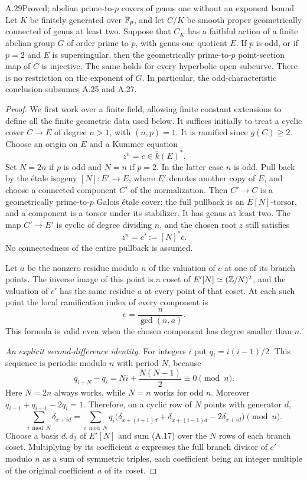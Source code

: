 \begin{claim}{A.29}{Proved; abelian prime-to-$p$ covers of genus one without an exponent bound}
Let $K$ be finitely generated over $\mathbb F_p$, and let $C/K$ be
smooth proper geometrically connected of genus at least two.
Suppose that $C_{\overline K}$ has a faithful action of a finite
abelian group $G$ of order prime to $p$, with genus-one quotient
$E$. If $p$ is odd, or if $p=2$ and $E$ is supersingular, then
the geometrically prime-to-$p$ point-section map of $C$ is
injective. The same holds for every hyperbolic open subcurve.
There is no restriction on the exponent of $G$. In particular,
the odd-characteristic conclusion subsumes A.25 and A.27.
\end{claim}
\begin{proof}
We first work over a finite field, allowing finite constant
extensions to define all the finite geometric data used below.
It suffices initially to treat a cyclic cover $C\to E$ of degree
$n>1$, with $(n,p)=1$. It is ramified since $g(C)\ge2$.
Choose an origin on $E$ and a Kummer equation
\[
 z^n=c\in\overline k(E)^*.
\]
Set $N=2n$ if $p$ is odd and $N=n$ if $p=2$. In the latter
case $n$ is odd. Pull back by the \'etale isogeny
$[N]:E'\to E$, where $E'$ denotes another copy of $E$, and
choose a connected component $C'$ of the normalization. Then
$C'\to C$ is a geometrically prime-to-$p$ Galois \'etale cover:
the full pullback is an $E[N]$-torsor, and a component is a
torsor under its stabilizer. It has genus at least two.
The map $C'\to E'$ is cyclic of degree dividing $n$, and the
chosen root $z$ still satisfies
\[
 z^n=c':=[N]^*c.
\]
No connectedness of the entire pullback is assumed.

Let $a$ be the nonzero residue modulo $n$ of the valuation of
$c$ at one of its branch points. The inverse image of this
point is a coset of $E'[N]\simeq(\mathbb Z/N)^2$, and the valuation
of $c'$ has the same residue $a$ at every point of that coset.
At each such point the local ramification index of every
component is
\[
 e=\frac n{\gcd(n,a)}.                                      \tag{A.16}
\]
This formula is valid even when the chosen component has
degree smaller than $n$.

\emph{An explicit second-difference identity.}
For integers $i$ put $q_i=i(i-1)/2$. This sequence is periodic
modulo $n$ with period $N$, because
\[
 q_{i+N}-q_i=Ni+\frac{N(N-1)}2\equiv0\pmod n.
\]
Here $N=2n$ always works, while $N=n$ works for odd $n$.
Moreover $q_{i-1}+q_{i+1}-2q_i=1$. Therefore, on a cyclic
row of $N$ points with generator $d$,
\[
 \sum_{i\bmod N}\delta_{x+id}
 =\sum_{i\bmod N}q_i
  \bigl(\delta_{x+(i+1)d}+\delta_{x+(i-1)d}
                  -2\delta_{x+id}\bigr)\pmod n.             \tag{A.17}
\]
Choose a basis $d,d_2$ of $E'[N]$ and sum (A.17) over the
$N$ rows of each branch coset. Multiplying by its coefficient
$a$ expresses the full branch divisor of $c'$ modulo $n$ as
a sum of symmetric triples, each coefficient being an integer
multiple of the original coefficient $a$ of its coset.


\end{proof}
